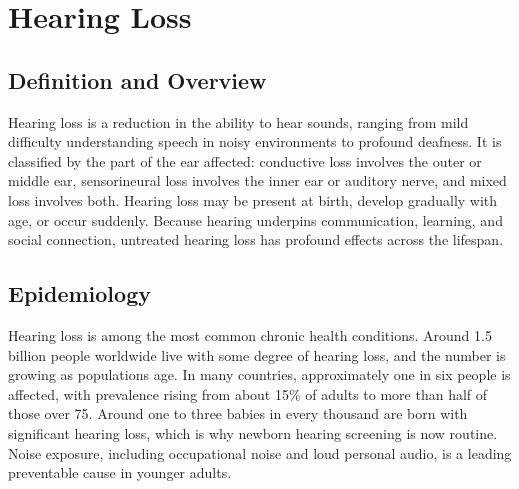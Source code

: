 \chapter{Hearing Loss}

\section*{Definition and Overview}
Hearing loss is a reduction in the ability to hear sounds, ranging from mild difficulty understanding speech in noisy environments to profound deafness. It is classified by the part of the ear affected: conductive loss involves the outer or middle ear, sensorineural loss involves the inner ear or auditory nerve, and mixed loss involves both. Hearing loss may be present at birth, develop gradually with age, or occur suddenly. Because hearing underpins communication, learning, and social connection, untreated hearing loss has profound effects across the lifespan.

\section*{Epidemiology}
Hearing loss is among the most common chronic health conditions. Around 1.5 billion people worldwide live with some degree of hearing loss, and the number is growing as populations age. In many countries, approximately one in six people is affected, with prevalence rising from about 15\% of adults to more than half of those over 75. Around one to three babies in every thousand are born with significant hearing loss, which is why newborn hearing screening is now routine. Noise exposure, including occupational noise and loud personal audio, is a leading preventable cause in younger adults.

